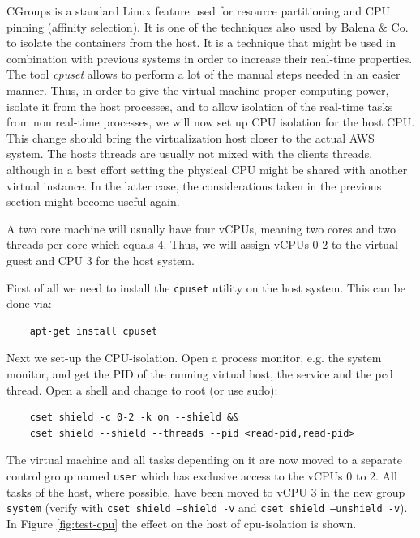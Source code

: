 \documentclass[]{scrartcl}
\begin{document}
CGroups is a standard Linux feature used for resource partitioning and CPU pinning (affinity selection). It is one of the techniques also used by Balena \& Co. to isolate the containers from the host. 
It is a technique that might be used in combination with previous systems in order to increase their real-time properties. The tool \textit{cpuset} allows to perform a lot of the manual steps needed in an easier manner. 
Thus, in order to give the virtual machine proper computing power, isolate it from the host processes, and to allow isolation of the real-time tasks from non real-time processes, we will now set up CPU isolation for the host CPU.
This change should bring the virtualization host closer to the actual AWS system. The hosts threads are usually not mixed with the clients threads, although in a best effort setting the physical CPU might be shared with another virtual instance.
In the latter case, the considerations taken in the previous section might become useful again.

A two core machine will usually have four vCPUs, meaning two cores and two threads per core which equals 4. Thus, we will assign vCPUs 0-2 to the virtual guest and CPU 3 for the host system.

First of all we need to install the \texttt{cpuset} utility on the host system. This can be done via:

\begin{verbatim}
	apt-get install cpuset
\end{verbatim}

Next we set-up the CPU-isolation. Open a process monitor, e.g. the system monitor, and get the PID of the running virtual host, the service and the pcd thread. Open a shell and change to root (or use sudo):

\begin{verbatim}
	cset shield -c 0-2 -k on --shield &&
	cset shield --shield --threads --pid <read-pid,read-pid>
\end{verbatim}

The virtual machine and all tasks depending on it are now moved to a separate control group named \texttt{user} which has exclusive access to the vCPUs 0 to 2. 
All tasks of the host, where possible, have been moved to vCPU 3 in the new group \texttt{system} (verify with \texttt{cset shield --shield -v} and \texttt{cset shield --unshield -v}). In Figure \ref{fig:test-cpu} the effect on the host of cpu-isolation is shown.
\end{document}
